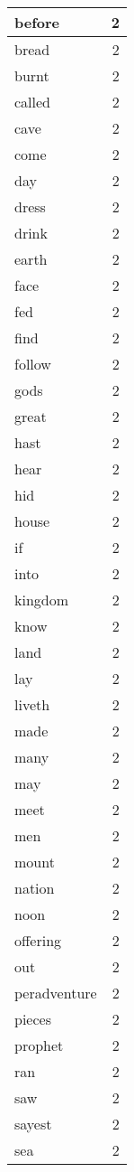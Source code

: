 \begin{center}
\begin{longtable}{l|r}
before & 2 \\ \hline
bread & 2 \\ \hline
burnt & 2 \\ \hline
called & 2 \\ \hline
cave & 2 \\ \hline
come & 2 \\ \hline
day & 2 \\ \hline
dress & 2 \\ \hline
drink & 2 \\ \hline
earth & 2 \\ \hline
face & 2 \\ \hline
fed & 2 \\ \hline
find & 2 \\ \hline
follow & 2 \\ \hline
gods & 2 \\ \hline
great & 2 \\ \hline
hast & 2 \\ \hline
hear & 2 \\ \hline
hid & 2 \\ \hline
house & 2 \\ \hline
if & 2 \\ \hline
into & 2 \\ \hline
kingdom & 2 \\ \hline
know & 2 \\ \hline
land & 2 \\ \hline
lay & 2 \\ \hline
liveth & 2 \\ \hline
made & 2 \\ \hline
many & 2 \\ \hline
may & 2 \\ \hline
meet & 2 \\ \hline
men & 2 \\ \hline
mount & 2 \\ \hline
nation & 2 \\ \hline
noon & 2 \\ \hline
offering & 2 \\ \hline
out & 2 \\ \hline
peradventure & 2 \\ \hline
pieces & 2 \\ \hline
prophet & 2 \\ \hline
ran & 2 \\ \hline
saw & 2 \\ \hline
sayest & 2 \\ \hline
sea & 2 \\ \hline

\end{longtable}
\end{center}
